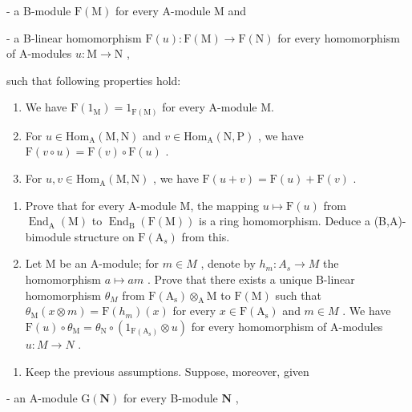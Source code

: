 - a B-module \(\mathrm{F(M)}\) for every A-module M and

- a B-linear homomorphism \(\mathrm{F}(u): \mathrm{F}(\mathrm{M}) \to \mathrm{F}(\mathrm{N})\) for every homomorphism of A-modules \(u: \mathrm{M} \to \mathrm{N}\) ,

such that following properties hold:

\begin{enumerate}
\def\labelenumi{(\roman{enumi})}
\item
  We have \(\mathrm{F}(1_{\mathrm{M}}) = 1_{\mathrm{F(M)}}\) for every A-module M.
\item
  For \(u \in \mathrm{Hom}_{\mathrm{A}}(\mathrm{M}, \mathrm{N})\) and \(v \in \mathrm{Hom}_{\mathrm{A}}(\mathrm{N}, \mathrm{P})\) , we have \(\mathrm{F}(v \circ u) = \mathrm{F}(v) \circ \mathrm{F}(u)\) .
\item
  For \(u, v \in \mathrm{Hom}_{\mathrm{A}}(\mathrm{M}, \mathrm{N})\) , we have \(\mathrm{F}(u + v) = \mathrm{F}(u) + \mathrm{F}(v)\) .
\end{enumerate}

\begin{enumerate}
\def\labelenumi{\alph{enumi})}
\item
  Prove that for every A-module M, the mapping \(u \mapsto \mathrm{F}(u)\) from \(\operatorname{End}_{\mathrm{A}}(\mathrm{M})\) to \(\operatorname{End}_{\mathrm{B}}(\mathrm{F}(\mathrm{M}))\) is a ring homomorphism. Deduce a (B,A)-bimodule structure on \(\mathrm{F}(\mathrm{A}_{s})\) from this.
\item
  Let M be an A-module; for \(m \in M\) , denote by \(h_{m} : A_{s} \to M\) the homomorphism \(a \mapsto am\) . Prove that there exists a unique B-linear homomorphism \(\theta_{M}\) from \(\mathrm{F(A_{s})} \otimes_{\mathrm{A}} \mathrm{M}\) to \(\mathrm{F(M)}\) such that \(\theta_{\mathrm{M}}(x \otimes m) = \mathrm{F}(h_{m})(x)\) for every \(x \in \mathrm{F(A_{s})}\) and \(m \in M\) . We have \(\mathrm{F}(u) \circ \theta_{\mathrm{M}} = \theta_{\mathrm{N}} \circ (1_{\mathrm{F(A_{s})}} \otimes u)\) for every homomorphism of A-modules \(u : M \to N\) .
\end{enumerate}

\begin{enumerate}
\def\labelenumi{\arabic{enumi})}
\setcounter{enumi}{6}
\tightlist
\item
  Keep the previous assumptions. Suppose, moreover, given
\end{enumerate}

- an A-module \(\mathrm{G}(\mathbf{N})\) for every B-module \(\mathbf{N}\) ,

